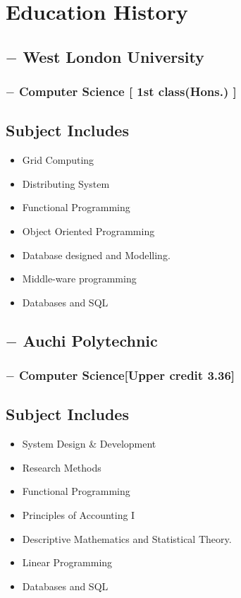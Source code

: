 \documentclass[11px]{article}
\begin{document}
 \hrulefill
\section*{Education History}
\subsection*{$-$ West London University}
\subsubsection*{$-$ Computer Science [ 1st class(Hons.) ]}
\subsection*{Subject Includes}
\begin{itemize}
	\item  Grid Computing
	\item Distributing System
	\item Functional Programming
	\item Object Oriented Programming
	\item Database designed and Modelling.
	\item Middle-ware programming
	\item Databases and SQL
\end{itemize}


\subsection*{$-$ Auchi Polytechnic}
\subsubsection*{$-$ Computer Science[Upper credit 3.36] }
\subsection*{Subject Includes}
\begin{itemize}
	\item System Design \& Development
	\item  Research Methods
	\item Functional Programming
	\item Principles of Accounting I
	\item Descriptive Mathematics and Statistical Theory.
	\item Linear Programming
	\item Databases and SQL
\end{itemize}	
\hrulefill
\end{document}
